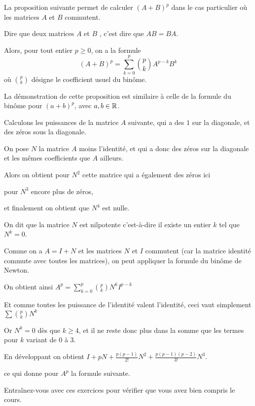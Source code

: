 \change
La proposition suivante permet de calculer $(A+B)^{p}$ dans le cas particulier où les matrices $A$ et $B$ commutent.

Dire que deux matrices $A$ et $B$ , c'est dire que $AB=BA$. 

\change
Alors, pour tout entier $p \ge 0$, on a la formule 
$$(A+B)^{p}= \sum_{k=0}^{p} \binom{p}{k} A^{p-k}B^{k}$$
où $\binom{p}{k}$ désigne le coefficient usuel du binôme.

La démonstration de cette proposition est similaire à celle de la formule du binôme pour $(a+b)^p$, avec $a,b \in \mathbb{R}$.


\diapo

Calculons les puissances de la matrice $A$ suivante, qui a des $1$ sur la diagonale, et des zéros sous la diagonale.

\change
On pose $N$ la matrice $A$ moins l'identité, et qui a donc des zéros sur la diagonale et les mêmes coefficients que $A$ ailleurs.

\change
Alors on obtient pour $N^2$ cette matrice qui a également des zéros ici

\change
pour $N^3$ encore plus de zéros, 

\change
et finalement on obtient que $N^4$ est nulle.

On dit que la matrice $N$ est nilpotente c'est-à-dire il existe un entier $k$ tel que $N^{k}=0$.

\diapo
Comme on a $A=I+N$ et les matrices $N$ et $I$ commutent (car la matrice identité 
commute avec toutes les matrices), on peut appliquer la formule du binôme de Newton. 

\change

On obtient ainsi
$
A^{p} = \sum_{k=0}^{p} \binom{p}{k} N^{k} I^{p-k}$

\change
Et comme toutes les puissance de l'identité valent l'identité, ceci vaut simplement $  \sum \binom{p}{k} N^{k} $
 
\change
Or $N^{k}=0$ dès que $k \geq 4$, et il ne reste donc plus dans la somme que les termes pour $k$ variant de $0$ à $3$.

\change
En développant on obtient $I+pN+\tfrac{p(p-1)}{2!}N^{2}+ \tfrac{p(p-1)(p-2)}{3!}N^{3}$.

\change
ce qui donne pour $A^p$ la formule suivante.





\diapo

Entraînez-vous avec ces exercices pour vérifier que vous avez bien compris le cours.




